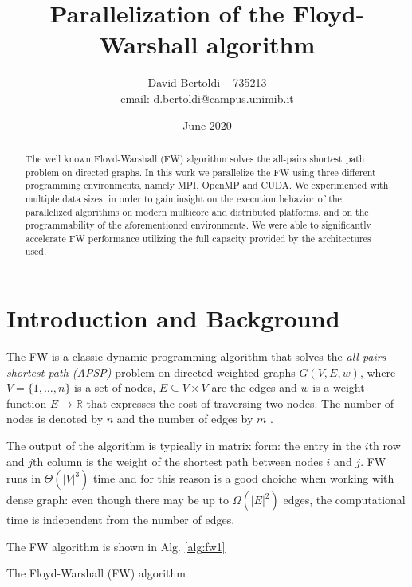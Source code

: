 \documentclass[twocolumns]{IEEEtran}
\title{Parallelization of the Floyd-Warshall algorithm}
\author{David Bertoldi -- 735213 \\ email: d.bertoldi@campus.unimib.it}
\affil{Department of Informatics, Systems and Communication}
\affil{University of Milano-Bicocca}
\date{June 2020}
\begin{document}
\maketitle 
\begin{abstract}
The well known Floyd-Warshall (FW) algorithm solves the all-pairs shortest path problem on directed graphs. In this work we parallelize the FW using three different
programming environments, namely MPI, OpenMP and CUDA. We experimented with multiple data sizes, in order to gain insight on the execution behavior
of the parallelized algorithms on modern multicore and distributed platforms, and on the programmability of the aforementioned environments. We were able
to significantly accelerate FW performance utilizing the full capacity provided by the architectures used.
\end{abstract}
\section{Introduction and Background}
The FW is a classic dynamic programming algorithm that solves the \emph{all-pairs shortest path (APSP)} problem on directed weighted
graphs $G(V, E, w)$, where $V = \{1, \dots, n\}$ is a set of nodes, $E \subseteq V \times V$ are the edges and $w$ is a weight function $E \rightarrow  \mathbb{R}$
that expresses the cost of traversing two nodes. The number of nodes is denoted by $n$ and the number of edges by $m$ . \par
The output of the algorithm is typically in matrix form: the entry in the $i$th row and $j$th column is the weight of the shortest path between
nodes $i$ and $j$. FW runs in $\Theta(|V|^3)$ time and for this reason is a good choiche when working with dense graph: even though there
may be up to $\Omega(|E|^2)$ edges, the computational time is independent from the number of edges. \par
The FW algorithm is shown in Alg. \ref{alg:fw1}

\begin{algorithm}[h!]
\label{alg:fw1}
\SetAlgoLined

 
 \caption[alg:fw1]{The Floyd-Warshall (FW) algorithm}
\end{algorithm}
\end{document}
